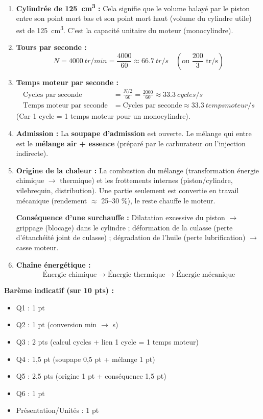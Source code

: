 \documentclass[11pt]{article}
\begin{document}
\begin{corrige}
\begin{enumerate}
\item \textbf{Cylindrée de \SI{125}{cm^3} :} Cela signifie que le volume balayé par le piston entre son point mort bas et son point mort haut (volume du cylindre utile) est de \SI{125}{cm^3}. C'est la capacité unitaire du moteur (monocylindre).
\item \textbf{Tours par seconde :}
      \[
      N = \SI{4000}{tr/min} = \frac{4000}{60} \approx \SI{66,7}{tr/s} \quad \left(\text{ou } \frac{200}{3} \text{ tr/s}\right)
      \]
\item \textbf{Temps moteur par seconde :}
      \begin{align*}
      \text{Cycles par seconde} &= \frac{N/2}{60} = \frac{2000}{60} \approx \SI{33,3}{cycles/s} \\
      \text{Temps moteur par seconde} &= \text{Cycles par seconde} \approx \SI{33,3}{temps moteur/s}
      \end{align*}
      (Car 1 cycle = 1 temps moteur pour un monocylindre).
\item \textbf{Admission :} La \textbf{soupape d'admission} est ouverte. Le mélange qui entre est le \textbf{mélange air + essence} (préparé par le carburateur ou l'injection indirecte).
\item \textbf{Origine de la chaleur :} La combustion du mélange (transformation énergie chimique $\rightarrow$ thermique) et les frottements internes (piston/cylindre, vilebrequin, distribution). Une partie seulement est convertie en travail mécanique (rendement $\approx$ 25--30 \%), le reste chauffe le moteur.
      \par \textbf{Conséquence d'une surchauffe :} Dilatation excessive du piston $\rightarrow$ grippage (blocage) dans le cylindre ; déformation de la culasse (perte d'étanchéité joint de culasse) ; dégradation de l'huile (perte lubrification) $\rightarrow$ casse moteur.
\item \textbf{Chaîne énergétique :}
      \[
      \text{Énergie chimique} \longrightarrow \text{Énergie thermique} \longrightarrow \text{Énergie mécanique}
      \]
\end{enumerate}

\textbf{Barème indicatif (sur 10 pts) :}
\begin{itemize}
\item Q1 : 1 pt
\item Q2 : 1 pt (conversion min $\rightarrow$ s)
\item Q3 : 2 pts (calcul cycles + lien 1 cycle = 1 temps moteur)
\item Q4 : 1,5 pt (soupape 0,5 pt + mélange 1 pt)
\item Q5 : 2,5 pts (origine 1 pt + conséquence 1,5 pt)
\item Q6 : 1 pt
\item Présentation/Unités : 1 pt
\end{itemize}


\end{corrige}
\end{document}
